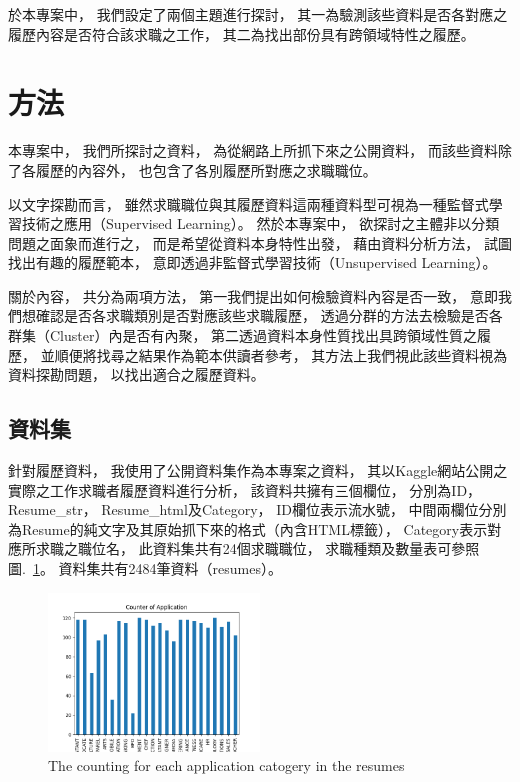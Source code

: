 \documentclass[sigconf]{acmart}
\begin{document}
於本專案中，
我們設定了兩個主題進行探討，
其一為驗測該些資料是否各對應之履歷內容是否符合該求職之工作，
其二為找出部份具有跨領域特性之履歷。

\section{方法}

本專案中，
我們所探討之資料，
為從網路上所抓下來之公開資料，
而該些資料除了各履歷的內容外，
也包含了各別履歷所對應之求職職位。

以文字探勘而言，
雖然求職職位與其履歷資料這兩種資料型可視為一種監督式學習技術之應用（Supervised Learning）\cite{murphy2012machine}。
然於本專案中，
欲探討之主體非以分類問題之面象而進行之，
而是希望從資料本身特性出發，
藉由資料分析方法，
試圖找出有趣的履歷範本，
意即透過非監督式學習技術（Unsupervised Learning）\cite{murphy2012machine}。

關於內容，
共分為兩項方法，
第一我們提出如何檢驗資料內容是否一致，
意即我們想確認是否各求職類別是否對應該些求職履歷，
透過分群的方法去檢驗是否各群集（Cluster）內是否有內聚，
第二透過資料本身性質找出具跨領域性質之履歷，
並順便將找尋之結果作為範本供讀者參考，
其方法上我們視此該些資料視為資料探勘問題\cite{han2011data}，
以找出適合之履歷資料。

\subsection{資料集}

針對履歷資料，
我使用了公開資料集作為本專案之資料，
其以Kaggle網站公開之實際之工作求職者履歷資料進行分析\cite{kaggle_dataset}，
該資料共擁有三個欄位，
分別為ID，
Resume\_str，
Resume\_html及Category，
ID欄位表示流水號，
中間兩欄位分別為Resume的純文字及其原始抓下來的格式（內含HTML標籤），
Category表示對應所求職之職位名，
此資料集共有24個求職職位，
求職種類及數量表可參照圖.~\ref{counter_of_application}。
資料集共有2484筆資料（resumes）。

\begin{figure}
    \centerline{\includegraphics[width=0.5\textwidth]{counter_of_application.png}}
    \caption{The counting for each application catogery in the resumes}
    \label{counter_of_application}
\end{figure}
\end{document}
